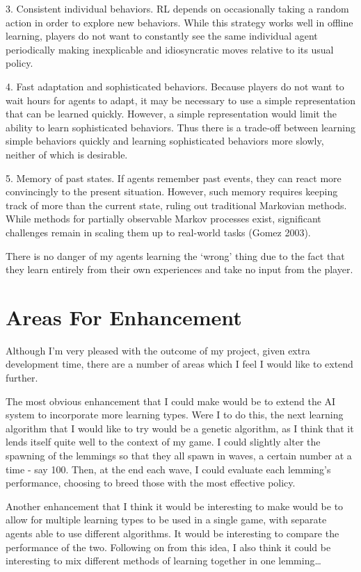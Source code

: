 \documentclass[a4paper,oneside]{report}
\begin{document}
3. Consistent individual behaviors. RL depends on occasionally taking a random action in order to explore new behaviors. While this strategy works well in offline learning, players do not want to constantly see the same individual agent periodically making inexplicable and idiosyncratic moves relative to its usual policy.

4. Fast adaptation and sophisticated behaviors. Because players do not want to wait hours for agents to adapt, it may be necessary to use a simple representation that can be learned quickly. However, a simple representation would limit the ability to learn sophisticated behaviors. Thus there is a trade-off between learning simple behaviors quickly and learning sophisticated behaviors more slowly, neither of which is desirable.

5. Memory of past states. If agents remember past events, they can react more convincingly to the present situation. However, such memory requires keeping track of more than the current state, ruling out traditional Markovian methods. While methods for partially observable Markov processes exist, significant challenges remain in scaling them up to real-world tasks (Gomez 2003).

There is no danger of my agents learning the `wrong' thing due to the fact that they learn entirely from their own experiences and take no input from the player.

\section{Areas For Enhancement}

Although I'm very pleased with the outcome of my project, given extra development time, there are a number of areas which I feel I would like to extend further.

The most obvious enhancement that I could make would be to extend the AI system to incorporate more learning types. Were I to do this, the next learning algorithm that I would like to try would be a genetic algorithm, as I think that it lends itself quite well to the context of my game. I could slightly alter the spawning of the lemmings so that they all spawn in waves, a certain number at a time - say 100. Then, at the end each wave, I could evaluate each lemming's performance, choosing to breed those with the most effective policy.

Another enhancement that I think it would be interesting to make would be to allow for multiple learning types to be used in a single game, with separate agents able to use different algorithms. It would be interesting to compare the performance of the two. Following on from this idea, I also think it could be interesting to mix different methods of learning together in one lemming…
\end{document}

